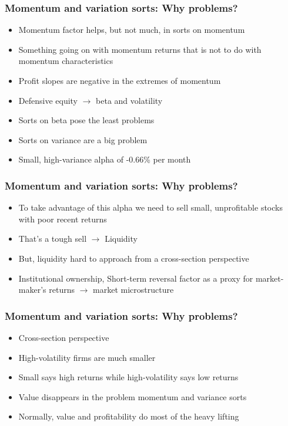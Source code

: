 \documentclass{beamer}
\begin{document}
\begin{frame}
\frametitle{Momentum and variation sorts: Why problems?}
\begin{itemize}
    \item<1-> Momentum factor helps, but not much, in sorts on momentum
    \item<1-> Something going on with momentum returns that is not to do with
    momentum characteristics
    \item<2-> Profit slopes are negative in the extremes of momentum
    \item<2-> Defensive equity $\rightarrow$ beta and volatility
    \item<3-> Sorts on beta pose the least problems
    \item<4-> Sorts on variance are a big problem
    \item<4-> Small, high-variance alpha of -0.66\% per month
\end{itemize}
\end{frame}

\begin{frame}
\frametitle{Momentum and variation sorts: Why problems?}
\begin{itemize}
    \item<1-> To take advantage of this alpha we need to sell small,
    unprofitable stocks with poor recent returns
    \item<2-> That's a tough sell $\rightarrow$ Liquidity
    \item<3-> But, liquidity hard to approach from a cross-section perspective
    \item<3-> Institutional ownership, Short-term reversal factor as a proxy
    for market-maker's returns $\rightarrow$ market microstructure
\end{itemize}
\end{frame}

\begin{frame}
\frametitle{Momentum and variation sorts: Why problems?}
\begin{itemize}
    \item<1-> Cross-section perspective
    \item<1-> High-volatility firms are much smaller
    \item<1-> Small says high returns while high-volatility says low returns
    \item<2-> Value disappears in the problem momentum and variance sorts
    \item<2-> Normally, value and profitability do most of the heavy lifting
\end{itemize}
\end{frame}
\end{document}
